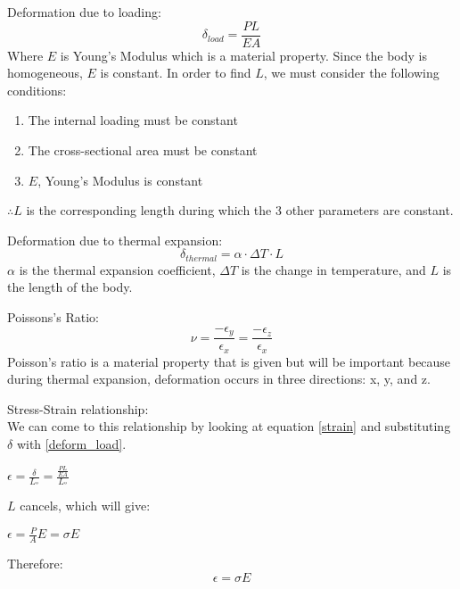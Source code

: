 \documentclass[12pt]{article}
\begin{document}
Deformation due to loading:
\begin{equation} \label{deform_load}
\delta_{load} = \frac{PL}{EA}
\end{equation}
Where $E$ is Young's Modulus which is a material property. Since the body is homogeneous, $E$ is constant. In order to find $L$, we must consider the following conditions:
\begin{enumerate}
	\item The internal loading must be constant
	\item The cross-sectional area must be constant
	\item $E$, Young's Modulus is constant
\end{enumerate}
$\therefore L$ is the corresponding length during which the 3 other parameters are constant.
\newline

Deformation due to thermal expansion:
\begin{equation} \label{deform_thermal}
\delta_{thermal} = \alpha \cdot \Delta T \cdot L
\end{equation}
$\alpha$ is the thermal expansion coefficient, $\Delta T$ is the change in temperature, and $L$ is the length of the body.

Poissons's Ratio:
\begin{equation} \label{poisson}
\nu=\frac{-\epsilon_{y}}{\epsilon_{x}} = \frac{-\epsilon_{z}}{\epsilon_{x}}
\end{equation}
Poisson's ratio is a material property that is given but will be important because during thermal expansion, deformation occurs in three directions: x, y, and z.
\newline

Stress-Strain relationship:\\
We can come to this relationship by looking at equation \ref{strain} and substituting $\delta$ with \ref{deform_load}.
\newline
\begin{center}
$\epsilon = \frac{\delta}{L_{º}} = \frac{\frac{PL}{EA}}{L_{º}}$
\end{center}
\pagebreak

$L$ cancels, which will give:
\newline
\begin{center}
$\epsilon = \frac{P}{A}E = \sigma E$
\end{center}
Therefore:
\begin{equation} \label{stress_strain}
\epsilon = \sigma E
\end{equation}
\end{document}
